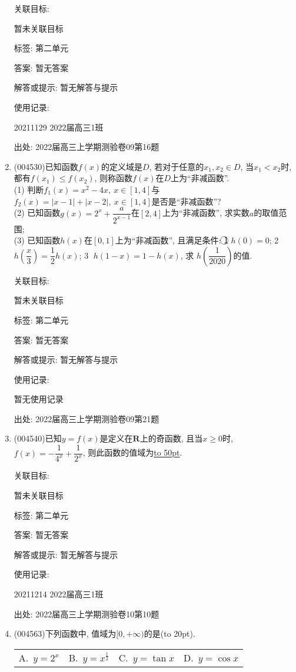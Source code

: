 \documentclass[10pt,a4paper]{article}
\newcommand{\blank}[1]{\underline{\hbox to #1pt{}}}
\newcommand{\bracket}[1]{(\hbox to #1pt{})}
\newcommand{\fourch}[4]{\par\begin{tabular}{p{.23\textwidth}p{.23\textwidth}p{.23\textwidth}p{.23\textwidth}}
A.~#1 &B.~#2& C.~#3& D.~#4
\end{tabular}}
\begin{document}
\begin{enumerate}[1.]
关联目标:

暂未关联目标



标签: 第二单元

答案: 暂无答案

解答或提示: 暂无解答与提示

使用记录:

20211129	2022届高三1班	


出处: 2022届高三上学期测验卷09第16题
\item { (004530)}已知函数$f(x)$的定义域是$D$, 若对于任意的$x_1,x_2\in D$, 当$x_1<x_2$时, 都有$f(x_1)\le f(x_2)$, 则称函数$f(x)$在$D$上为``非减函数''.\\
(1) 判断$f_1(x)=x^2-4x, \ x\in [1,4]$与$f_2(x)=|x-1|+|x-2|, \ x\in [1,4]$是否是``非减函数''?\\
(2) 已知函数$g(x)=2^x+\dfrac a{2^{x-1}}$在$[2,4]$上为``非减函数'', 求实数$a$的取值范围;\\
(3) 已知函数$h(x)$在$[0,1]$上为``非减函数'', 且满足条件:
\textcircled{1}  $h(0)=0$; \textcircled{2}  $h(\dfrac x3)=\dfrac 12h(x)$; \textcircled{3}  $h(1-x)=1-h(x)$, 求 $h(\dfrac 1{2020})$的值.


关联目标:

暂未关联目标



标签: 第二单元

答案: 暂无答案

解答或提示: 暂无解答与提示

使用记录:

暂无使用记录


出处: 2022届高三上学期测验卷09第21题
\item { (004540)}已知$y=f(x)$是定义在$\mathbf{R}$上的奇函数, 且当$x\ge 0$时, $f(x)=-\dfrac 1{4^x}+\dfrac 1{2^x}$, 则此函数的值域为\blank{50}.


关联目标:

暂未关联目标



标签: 第二单元

答案: 暂无答案

解答或提示: 暂无解答与提示

使用记录:

20211214	2022届高三1班	


出处: 2022届高三上学期测验卷10第10题
\item { (004563)}下列函数中, 值域为$[0,+\infty)$的是\bracket{20}.
\fourch{$y=2^x$}{$y=x^\frac 12$}{$y=\tan x$}{$y=\cos x$}



\end{enumerate}
\end{document}
